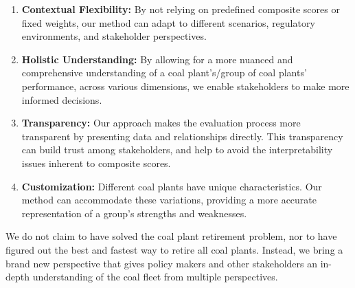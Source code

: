 \begin{enumerate}
    \item \textbf{Contextual Flexibility:} By not relying on predefined composite scores or fixed weights, our method can adapt to different scenarios, regulatory environments, and stakeholder perspectives.
    \item \textbf{Holistic Understanding:} By allowing for a more nuanced and comprehensive understanding of a coal plant's/group of coal plants' performance, across various dimensions, we enable stakeholders to make more informed decisions.
    \item \textbf{Transparency:} Our approach makes the evaluation process more transparent by presenting data and relationships directly. This transparency can build trust among stakeholders, and help to avoid the interpretability issues inherent to composite scores.
    \item \textbf{Customization:} Different coal plants have unique characteristics. Our method can accommodate these variations, providing a more accurate representation of a group's strengths and weaknesses.
\end{enumerate}

We do not claim to have solved the coal plant retirement problem, nor to have figured out the best and fastest way to retire all coal plants. 
Instead, we bring a brand new perspective that gives policy makers and other stakeholders an in-depth understanding of the coal fleet from 
multiple perspectives.